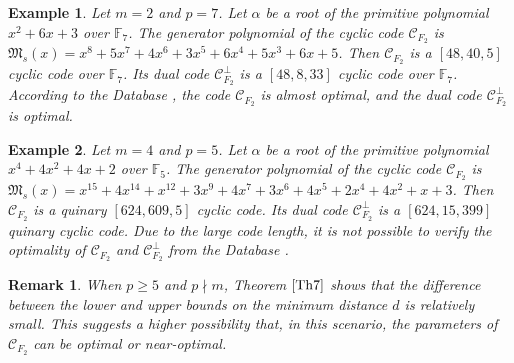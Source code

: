 \documentclass[pdflatex,sn-mathphys-num]{sn-jnl}%
\theoremstyle{thmstyleone}%
\theoremstyle{thmstyletwo}%
\newtheorem{example}{Example}%
\newtheorem{remark}{Remark}%
\theoremstyle{thmstylethree}%
\begin{document}
\vspace{1em}
\begin{example}
    Let $m=2$ and $p=7$. Let $\alpha$ be a root of the primitive polynomial $x^2 + 6x + 3$ over $\mathbb{F}_{7}$. The generator polynomial of the cyclic code $\mathcal{C}_{F_{2}}$ is $\mathfrak{M}_{s}(x)=x^8 + 5x^7 + 4x^6 + 3x^5 + 6x^4 + 5x^3 + 6x + 5$. Then $\mathcal{C}_{F_{2}}$ is a $[48, 40, 5]$ cyclic code over $\mathbb{F}_{7}$. Its dual code  $\mathcal{C}_{F_{2}}^{\perp}$ is a $[48, 8, 33]$ cyclic code over $\mathbb{F}_{7}$. According to the Database \textnormal{\cite{Database}}, the code $\mathcal{C}_{F_{2}}$ is almost optimal, and the dual code $\mathcal{C}_{F_{2}}^{\perp}$ is optimal.
\end{example}
\vspace{1em}
\begin{example}
    Let $m=4$ and $p=5$. Let $\alpha$ be a root of the primitive polynomial $x^4 + 4x^2 + 4x + 2$ over $\mathbb{F}_{5}$. The generator polynomial of the cyclic code $\mathcal{C}_{F_{2}}$ is $\mathfrak{M}_{s}(x)=x^{15} + 4x^{14} + x^{12} + 3x^9 + 4x^7 + 3x^6 + 4x^5 + 2x^4 + 4x^2 + x + 3$. Then $\mathcal{C}_{F_{2}}$ is a quinary $[624, 609, 5]$ cyclic code. Its dual code  $\mathcal{C}_{F_{2}}^{\perp}$ is a $[624,15,399]$ quinary cyclic code. Due to the large code length, it is not possible to verify the optimality of $\mathcal{C}_{F_{2}}$ and $\mathcal{C}_{F_{2}}^{\perp}$ from the Database \textnormal{\cite{Database}}.  
\end{example}
\vspace{1em}
\begin{remark}
    When $p\geq 5$ and $p\nmid m$, Theorem $\ref{Th7}$ shows that the difference between the lower and upper bounds on the minimum distance $d$ is relatively small. This suggests a higher possibility that, in this scenario, the parameters of $\mathcal{C}_{F_{2}}$ can be optimal or near-optimal.   
\end{remark}
\end{document}
